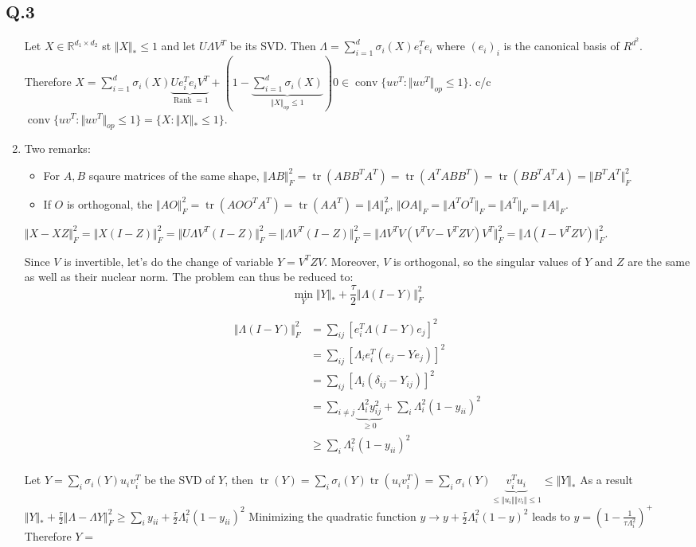 \documentclass[12pt]{article}\usepackage[]{graphicx}\usepackage[]{color}
\newcommand{\Q}[1]{\subsection*{Q.#1}}
\newenvironment{question}[1]
{\Q{#1}}{}
\newcommand{\norm}[1]{\Vert #1 \Vert}
\newcommand{\fnorm}[1]{\Vert #1 \Vert_F}
\newcommand{\nucnorm}[1]{\Vert #1 \Vert_*}
\DeclareMathOperator{\tr}{tr}
\DeclareMathOperator{\rank}{Rank}
\DeclareMathOperator{\conv}{conv}
\begin{document}
\begin{question}{3}
\begin{enumerate}
    Let $X \in \mathbb R^{d_1 \times d_2}$ st $\Vert X\Vert _* \le 1$ and let $U\Lambda V^T$ be its SVD. Then $\Lambda = \sum_{i=1}^d \sigma_i(X) e_i^Te_i$ where $(e_i)_i$ is the canonical basis of $R^{d^2}$.
    Therefore $X = \sum_{i=1}^d \sigma_i(X) \underbrace{Ue_i^Te_iV^T}_{\rank =1} + (1 - \underbrace{\sum_{i=1}^d \sigma_i(X)}_{\Vert X\Vert _{op} \le 1}) 0 \in \conv \{ uv^T : \Vert uv^T\Vert _{op} \le 1 \}  $.
    c/c     $\conv \{ uv^T : \Vert uv^T\Vert _{op} \le 1 \} = \{ X : \Vert X\Vert _{*} \le  1\}$.
  \item 
    Two remarks:
    \begin{itemize}
    \item For $A, B$ sqaure matrices of the same shape, $\Vert AB\Vert _F^2 = \tr(ABB^TA^T) = \tr(A^TA BB^T) =  \tr(BB^T A^TA) = \Vert B^TA^T\Vert _F^2$
    \item If $O$ is orthogonal, the $\Vert AO\Vert _F^2 = \tr(AOO^TA^T) = \tr(AA^T) = \Vert A\Vert _F^2$, $\Vert OA\Vert _F = \Vert A^TO^T\Vert _F = \Vert A^T\Vert _F = \Vert A\Vert _F$.
    \end{itemize}

    $\Vert X - XZ\Vert _F^2 = \Vert X (I - Z)\Vert _F^2 = \Vert U \Lambda V^T(I - Z)\Vert _F^2 = \Vert \Lambda V^T(I - Z)\Vert _F^2 = \Vert \Lambda V^T V(V^TV - V^TZV)V^T\Vert _F^2 = \Vert \Lambda (I - V^TZV)\Vert _F^2$.

    Since $V$ is invertible, let's do the change of variable $Y = V^TZV$. Moreover, $V$ is orthogonal, so the singular values of $Y$ and $Z$ are the same as well as their nuclear norm. The problem can thus be reduced to:
    $$\min_Y \Vert Y\Vert _* + \frac{\tau}2 \Vert \Lambda(I -  Y)\Vert _F^2$$

    \begin{align*}
      \fnorm{\Lambda (I - Y)}^2 &= \sum_{ij} [e_i^T \Lambda (I - Y)e_j]^2 \\
                                &= \sum_{ij} [\Lambda_i e_i^T(e_j - Ye_j)]^2 \\
                                &= \sum_{ij} [\Lambda_i (\delta_{ij} - Y_{ij})]^2 \\
                                &= \sum_{i \ne j} \underbrace{\Lambda_i^2 y_{ij}^2}_{\ge 0}  + \sum_i \Lambda_i^2 (1 - y_{ii})^2  \\
                                & \ge \sum_i \Lambda_i^2 (1 - y_{ii})^2  \\
    \end{align*}

    Let $Y = \sum_i \sigma_i(Y) u_iv_i^T$ be the SVD of $Y$, then $\tr(Y) = \sum_i \sigma_i(Y) \tr(u_iv_i^T)= \sum_i \sigma_i(Y) \underbrace{v_i^Tu_i}_{\le \norm{u_i}\norm{v_i} \le 1} \le \nucnorm{Y}$
    As a result $\nucnorm{Y} + \frac{\tau}2 \fnorm{\Lambda - \Lambda Y}^2 \ge \sum_i y_{ii} + \frac{\tau} 2 \Lambda_i^2(1 - y_{ii})^2$
    Minimizing the quadratic function $y \rightarrow y + \frac{\tau}2 \Lambda_i^2 (1 - y)^2$ leads to $y = (1 - \frac1{\tau \Lambda_i^2})^+$
    Therefore $Y = $
  \end{enumerate}
  
\end{question}
\end{document}
